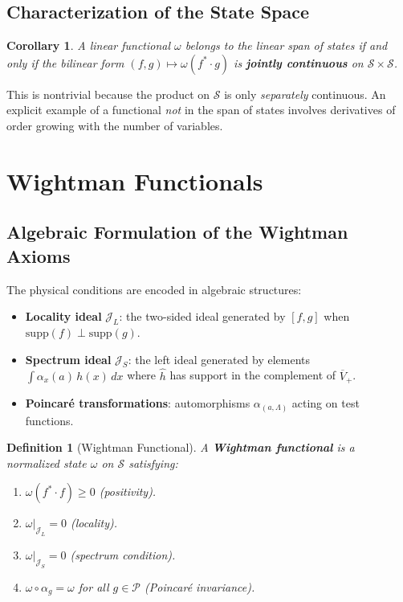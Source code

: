 \documentclass[11pt,a4paper]{article}
\newtheorem{definition}{Definition}[section]
\newtheorem{corollary}{Corollary}[section]
\begin{document}
\subsection{Characterization of the State Space}

\begin{corollary}
A linear functional $\omega$ belongs to the linear span of states if
and only if the bilinear form $(f,g) \mapsto \omega(f^* \cdot g)$ is
\textbf{jointly continuous} on $\mathcal{S} \times \mathcal{S}$.
\end{corollary}

This is nontrivial because the product on $\mathcal{S}$ is only
\emph{separately} continuous. An explicit example of a functional
\emph{not} in the span of states involves derivatives of order growing
with the number of variables.

\section{Wightman Functionals}

\subsection{Algebraic Formulation of the Wightman Axioms}

The physical conditions are encoded in algebraic structures:
\begin{itemize}[nosep]
  \item \textbf{Locality ideal} $\mathcal{J}_L$: the two-sided ideal
        generated by $[f,g]$ when $\mathrm{supp}(f) \perp \mathrm{supp}(g)$.
  \item \textbf{Spectrum ideal} $\mathcal{J}_S$: the left ideal generated
        by elements $\int \alpha_x(a)\, h(x)\, dx$ where $\hat{h}$ has
        support in the complement of $\overline{V}_+$.
  \item \textbf{Poincar\'e transformations}: automorphisms
        $\alpha_{(a,\Lambda)}$ acting on test functions.
\end{itemize}

\begin{definition}[Wightman Functional]
A \textbf{Wightman functional} is a normalized state $\omega$ on
$\mathcal{S}$ satisfying:
\begin{enumerate}[nosep]
  \item $\omega(f^* \cdot f) \geq 0$ (positivity).
  \item $\omega|_{\mathcal{J}_L} = 0$ (locality).
  \item $\omega|_{\mathcal{J}_S} = 0$ (spectrum condition).
  \item $\omega \circ \alpha_g = \omega$ for all $g \in \mathcal{P}$
        (Poincar\'e invariance).
\end{enumerate}
\end{definition}
\end{document}
